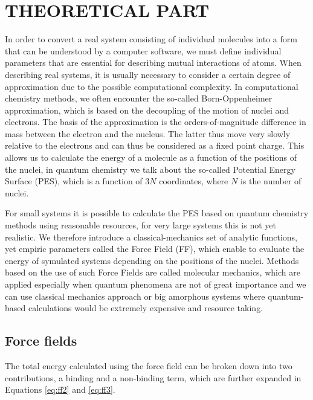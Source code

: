 \newpage
\section{THEORETICAL PART}

In order to convert a real system consisting of individual molecules into a form that can be understood by a computer software, we must define individual parameters that are essential for describing mutual interactions of atoms. When describing real systems, it is usually necessary to consider a certain degree of approximation due to the possible computational complexity. In computational chemistry methods, we often encounter the so-called Born-Oppenheimer approximation, which is based on the decoupling of the motion of nuclei and electrons. The basis of the approximation is the orders-of-magnitude difference in mass between the electron and the nucleus. The latter thus move very slowly relative to the electrons and can thus be considered as a fixed point charge. This allows us to calculate the energy of a molecule as a function of the positions of the nuclei, in quantum chemistry we talk about the so-called Potential Energy Surface (PES), which is a function of 3$N$ coordinates, where $N$ is the number of nuclei. \cite{leach_molecular_2001} 

For small systems it is possible to calculate the PES based on quantum chemistry methods using reasonable resources, for very large systems this is not yet realistic. We therefore introduce a classical-mechanics set of analytic functions, yet empiric parameters called the Force Field (FF), which enable to evaluate the energy of symulated systems depending on the positions of the nuclei. Methods based on the use of such Force Fields are called molecular mechanics, which are applied especially when quantum phenomena are not of great importance and we can use classical mechanics approach or big amorphous systems where quantum-based calculations would be extremely expensive and resource taking. \cite{monticelli_force_2013}

\subsection{Force fields}
The total energy calculated using the force field can be broken down into two contributions, a binding and a non-binding term, which are further expanded in Equations \ref{eq:ff2} and \ref{eq:ff3}.

